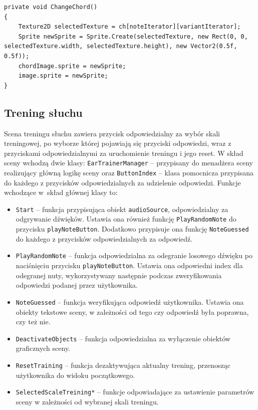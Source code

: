 \begin{lstlisting}[style=sharpcstyle,caption=Funkcja \texttt{ChangeChord}, label=lst:3]
private void ChangeChord()
{
    Texture2D selectedTexture = ch[noteIterator][variantIterator];
    Sprite newSprite = Sprite.Create(selectedTexture, new Rect(0, 0, selectedTexture.width, selectedTexture.height), new Vector2(0.5f, 0.5f));        
    chordImage.sprite = newSprite;        
    image.sprite = newSprite;
}
\end{lstlisting}

\subsection{Trening słuchu}

Scena treningu słuchu zawiera przycisk odpowiedzialny za wybór skali treningowej, po wyborze której pojawiają się przyciski odpowiedzi, wraz z przyciskami odpowiedzialnymi za uruchomienie treningu i jego reset. W skład sceny wchodzą dwie klasy: \texttt{EarTrainerManager} -- przypisany do menadżera sceny realizujący główną logikę sceny oraz \texttt{ButtonIndex} -- klasa pomocnicza przypisana do każdego z przycisków odpowiedzialnych za udzielenie odpowiedzi. Funkcje wchodzące w~skład głównej klasy to:
\begin{itemize}
    \item \texttt{Start} -- funkcja przypisująca obiekt \texttt{audioSource}, odpowiedzialny za odgrywanie dźwięków. Ustawia ona również funkcję \texttt{PlayRandomNote} do przycisku \texttt{playNoteButton}. Dodatkowo przypisuje ona funkcję \texttt{NoteGuessed} do każdego z przycisków odpowiedzialnych za odpowiedź.
    \item \texttt{PlayRandomNote} -- funkcja odpowiedzialna za odegranie losowego dźwięku po naciśnięciu przycisku \texttt{playNoteButton}. Ustawia ona odpowiedni index dla odegranej nuty, wykorzystywany następnie podczas zweryfikowania odpowiedzi podanej przez użytkownika.
    \item \texttt{NoteGuessed} -- funkcja weryfikująca odpowiedź użytkownika. Ustawia ona obiekty tekstowe sceny, w zależności od tego czy odpowiedź była poprawna, czy też nie. 
    \item \texttt{DeactivateObjects} -- funkcja odpowiedzialna za wyłączenie obiektów graficznych sceny.
    \item \texttt{ResetTraining} -- funkcja dezaktywująca aktualny trening, przenosząc użytkownika do widoku początkowego.
    \item \texttt{SelectedScaleTreining*} -- funkcje odpowiadające za ustawienie parametrów sceny w zależności od wybranej skali treningu.
\end{itemize}

